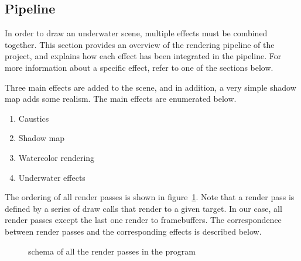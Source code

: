 \documentclass{article}
\begin{document}
\subsection{Pipeline}

In order to draw an underwater scene, multiple effects must be combined together. This section provides an overview of the rendering pipeline of the project, and explains how each effect has been integrated in the pipeline. For more information about a specific effect, refer to one of the sections below.

Three main effects are added to the scene, and in addition, a very simple shadow map adds some realism. The main effects are enumerated below.
\begin{enumerate}
	\item Caustics
	\item Shadow map
	\item Watercolor rendering
	\item Underwater effects
\end{enumerate}

The ordering of all render passes is shown in figure~\ref{fig:render_passes}. Note that a render pass is defined by a series of draw calls that render to a given target. In our case, all render passes except the last one render to framebuffers. The correspondence between render passes and the corresponding effects is described below.


\begin{figure}[h]
	\caption{schema of all the render passes in the program}
	\label{fig:render_passes}
\end{figure}
\end{document}
